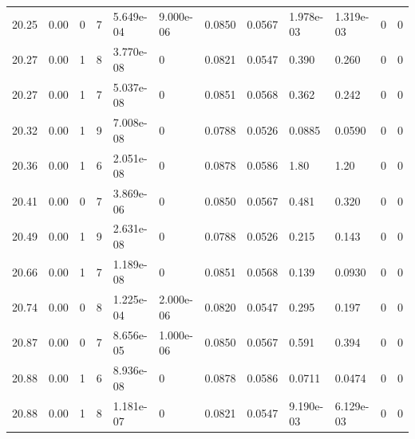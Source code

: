 \documentclass[preview]{standalone}
\begin{document}
{{{{{\begin{tabular}{L{1.2cm}C{1.2cm} C{0.3cm}C{0.5cm} C{1.4cm}C{1.4cm} C{1.4cm}C{1.4cm} C{1.6cm}C{1.6cm} C{1.6cm}C{1.6cm}}
  20.25  &  0.00  & 0     &  7 &  5.649e-04  & 9.000e-06  &  0.0850&   0.0567& 1.978e-03 & 1.319e-03   &  0 & 0  \\ 
  20.27  &  0.00  & 1     &  8 &  3.770e-08  & 0  &  0.0821&   0.0547& 0.390 & 0.260   &  0 & 0  \\ 
  20.27  &  0.00  & 1     &  7 &  5.037e-08  & 0  &  0.0851&   0.0568& 0.362 & 0.242   &  0 & 0  \\ 
  20.32  &  0.00  & 1     &  9 &  7.008e-08  & 0  &  0.0788&   0.0526& 0.0885 & 0.0590   &  0 & 0  \\ 
  20.36  &  0.00  & 1     &  6 &  2.051e-08  & 0  &  0.0878&   0.0586& 1.80 & 1.20   &  0 & 0  \\ 
  20.41  &  0.00  & 0     &  7 &  3.869e-06  & 0  &  0.0850&   0.0567& 0.481 & 0.320   &  0 & 0  \\ 
  20.49  &  0.00  & 1     &  9 &  2.631e-08  & 0  &  0.0788&   0.0526& 0.215 & 0.143   &  0 & 0  \\ 
  20.66  &  0.00  & 1     &  7 &  1.189e-08  & 0  &  0.0851&   0.0568& 0.139 & 0.0930   &  0 & 0  \\ 
  20.74  &  0.00  & 0     &  8 &  1.225e-04  & 2.000e-06  &  0.0820&   0.0547& 0.295 & 0.197   &  0 & 0  \\ 
  20.87  &  0.00  & 0     &  7 &  8.656e-05  & 1.000e-06  &  0.0850&   0.0567& 0.591 & 0.394   &  0 & 0  \\ 
  20.88  &  0.00  & 1     &  6 &  8.936e-08  & 0  &  0.0878&   0.0586& 0.0711 & 0.0474   &  0 & 0  \\ 
  20.88  &  0.00  & 1     &  8 &  1.181e-07  & 0  &  0.0821&   0.0547& 9.190e-03 & 6.129e-03   &  0 & 0  \\ 
\hline 
\end{tabular} 

}}}}}
\end{document}
